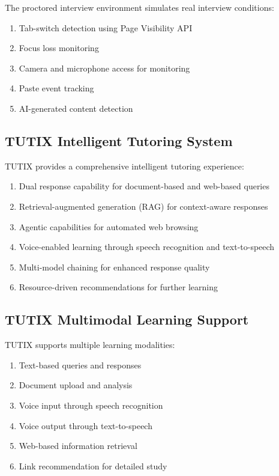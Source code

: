 \documentclass[12pt, conference]{IEEEtran}
\begin{document}
The proctored interview environment simulates real interview conditions:
\begin{enumerate}
    \item Tab-switch detection using Page Visibility API
    \item Focus loss monitoring
    \item Camera and microphone access for monitoring
    \item Paste event tracking
    \item AI-generated content detection
\end{enumerate}

\subsection{TUTIX Intelligent Tutoring System}

TUTIX provides a comprehensive intelligent tutoring experience:
\begin{enumerate}
    \item Dual response capability for document-based and web-based queries
    \item Retrieval-augmented generation (RAG) for context-aware responses
    \item Agentic capabilities for automated web browsing
    \item Voice-enabled learning through speech recognition and text-to-speech
    \item Multi-model chaining for enhanced response quality
    \item Resource-driven recommendations for further learning
\end{enumerate}

\subsection{TUTIX Multimodal Learning Support}

TUTIX supports multiple learning modalities:
\begin{enumerate}
    \item Text-based queries and responses
    \item Document upload and analysis
    \item Voice input through speech recognition
    \item Voice output through text-to-speech
    \item Web-based information retrieval
    \item Link recommendation for detailed study
\end{enumerate}
\end{document}
